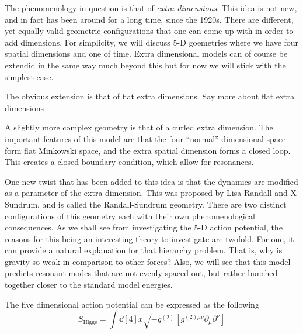 \documentclass[12pt]{article}
\newcommand{\pd}{\partial}
\begin{document}
The phenomenology in question is that of \textit{extra dimensions}. This idea is
not new, and in fact has been around for a long time, since the 1920s. There are
different, yet equally valid geometric configurations that one can come up with
in order to add dimensions. For simplicity, we will discuss 5-D goemetries where
we have four spatial dimensions and one of time. Extra dimensional models can of
course be extendid in the same way much beyond this but for now we will stick
with the simplest case.

The obvious extension is that of flat extra dimensions. Say more about flat
extra dimensions

A slightly more complex geometry is that of a curled extra dimension. The
important features of this model are that the four ``normal'' dimensional space
form flat Minkowski space, and the extra spatial dimension forms a closed loop.
This creates a closed boundary condition, which allow for resonances.

One new twist that has been added to this idea is that the dynamics are modified
as a parameter of the extra dimension. This was proposed by Lisa Randall and X
Sundrum, and is called the Randall-Sundrum geometry. There are two distinct
configurations of this geometry each with their own phenomenological
consequences. As we shall see from investigating the 5-D action potential, the
reasons for this being an interesting theory to investigate are twofold. For
one, it can provide a natural explanation for that hierarchy problem. That is,
why is gravity so weak in comparison to other forces? Also, we will see that
this model predicts resonant modes that are not evenly spaced out, but rather
bunched together closer to the standard model energies.

The five dimensional action potential can be expressed as the following
\begin{equation}
    S_{\text{Higgs}} = \int
    \dd[4]{x}\sqrt{-g^{(2)}} \left[g^{(2)\mu\nu}\pd_\mu\pd^\nu \right]
\end{equation}
\end{document}
